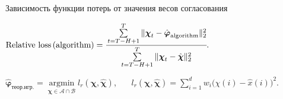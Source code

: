 \documentclass{beamer}
\newcommand\argmin{\mathop{\arg\min}}
\newcommand{\A}{\mathcal{A}}
\newcommand{\hchi}{\hat{\boldsymbol{\chi}}}
\newcommand{\hphi}{\hat{\boldsymbol{\varphi}}}
\newcommand{\B}{\mathcal{B}}
\newcommand{\hx}{\hat{x}}
\begin{document}
\begin{frame}{\small Зависимость функции потерь от значения весов согласования}
    \footnotesize

    \begin{center}
        \vspace{-0.3cm}
        $\text{Relative loss\,(algorithm)} = \cfrac{\sum\limits_{t=T-H+1}^T \| \boldsymbol{\chi}_t - \hphi_\text{algorithm} \|^2_2}
        {\sum\limits_{t=T-H+1}^T \| \boldsymbol{\chi}_t - \hchi \|^2_2}.$

        \vspace{0.3cm}
        $\hphi_{\text{теор.игр.}} = \argmin\limits_{\boldsymbol{\chi} \in \A \cap \B}
        l_r(\boldsymbol{\chi}, \hchi)$, ~~~$l_r(\boldsymbol{\chi}, \hchi) = \sum\limits_{i=1}^d w_i
        \bigl(\chi(i) - \hx(i)\bigr)^2$.
    \end{center}


\end{frame}
\end{document}
